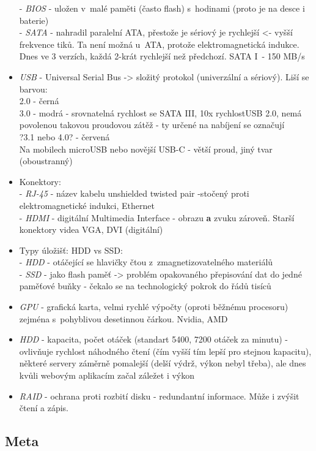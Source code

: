 \documentclass[12pt]{article}
\begin{document}
\begin{itemize}
 - \emph{BIOS} - uložen v~malé paměti (často flash) s~hodinami (proto je na desce i baterie)\\
 - \emph{SATA} - nahradil paralelní ATA, přestože je sériový je rychlejší <- vyšší frekvence tiků. Ta není možná u~ATA, protože elektromagnetická indukce. Dnes ve 3 verzích, každá 2-krát rychlejší než předchozí. SATA I~- 150 MB/s\\
 \item \emph{USB} - Universal Serial Bus -> složitý protokol (univerzální a sériový). Liší se barvou:\\2.0 - černá\\3.0 - modrá - srovnatelná rychlost se SATA III, 10x rychlostUSB 2.0, nemá povolenou takovou proudovou zátěž - ty určené na nabíjení se označují \\?3.1 nebo 4.0? - červená\\
Na mobilech microUSB nebo novější USB-C - větší proud, jiný tvar (oboustranný)
\item Konektory:\\
 - \emph{RJ-45} - název kabelu unshielded twisted pair -stočený proti elektromagnetické indukci, Ethernet\\
 - \emph{HDMI} - digitální Multimedia Interface - obrazu \textbf{a} zvuku zároveň. Starší konektory videa VGA, DVI (digitální)
\item Typy úložišť: HDD vs SSD:\\
 - \emph{HDD} - otáčející se hlavičky čtou z~zmagnetizovatelného materiálů\\
 - \emph{SSD} - jako flash paměť -> problém opakovaného přepisování dat do jedné paměťové buňky - čekalo se na technologický pokrok do řádů tisíců\\
\item \emph{GPU} - grafická karta, velmi rychlé výpočty (oproti běžnému procesoru) zejména s~pohyblivou desetinnou čárkou. Nvidia, AMD
\item \emph{HDD} - kapacita, počet otáček (standart 5400, 7200 otáček za minutu) - ovlivňuje rychlost náhodného čtení (čím vyšší tím lepší pro stejnou kapacitu), některé servery záměrně pomalejší (delší výdrž, výkon nebyl třeba), ale dnes kvůli webovým aplikacím začal záležet i výkon
\item \emph{RAID} - ochrana proti rozbití disku - redundantní informace. Může i zvýšit čtení a zápis. 
\end{itemize} 

\subsection{Meta}
\end{document}
